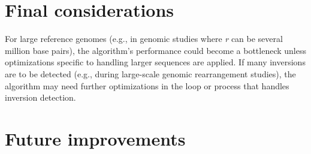 \section{Final considerations}
For large reference genomes (e.g., in genomic studies where \textit{r} can be several million base pairs), the algorithm's performance could become a bottleneck unless optimizations specific to handling larger sequences are applied. If many inversions are to be detected (e.g., during large-scale genomic rearrangement studies), the algorithm may need further optimizations in the loop or process that handles inversion detection. 



\section{Future improvements}